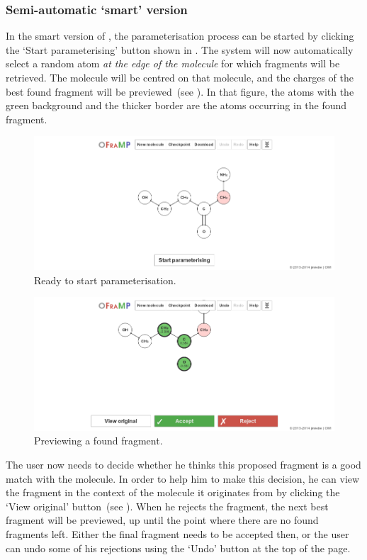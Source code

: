 \subsubsection{Semi-automatic `smart' version}
In the smart version of \oframp, the parameterisation process can be started by clicking the `Start parameterising' button shown in . The system will now automatically select a random atom \emph{at the edge of the molecule} for which fragments will be retrieved. The molecule will be centred on that molecule, and the charges of the best found fragment will be previewed~(see ). In that figure, the atoms with the green background and the thicker border are the atoms occurring in the found fragment.

\begin{figure}
\begin{center}
\includegraphics[width=.9\textwidth]{img/find_3.png}
\caption{Ready to start parameterisation.}
\end{center}
\end{figure}

\begin{figure}
\begin{center}
\includegraphics[width=.9\textwidth]{img/find_4.png}
\caption{Previewing a found fragment.}
\end{center}
\end{figure}

The user now needs to decide whether he thinks this proposed fragment is a good match with the molecule. In order to help him to make this decision, he can view the fragment in the context of the molecule it originates from by clicking the `View original' button~(see ). When he rejects the fragment, the next best fragment will be previewed, up until the point where there are no found fragments left. Either the final fragment needs to be accepted then, or the user can undo some of his rejections using the `Undo' button at the top of the page.

